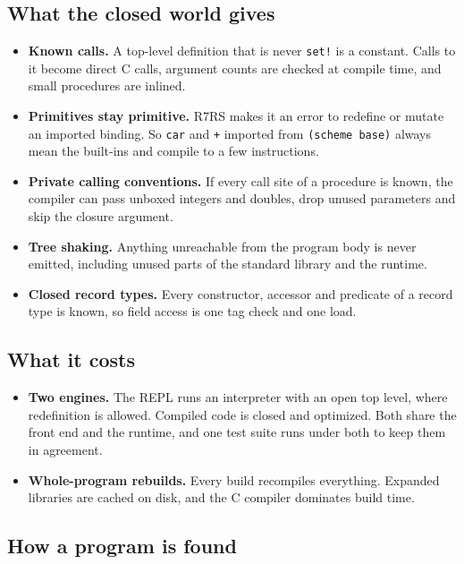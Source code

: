 \documentclass[a4paper,11pt]{article}
\begin{document}
\subsection{What the closed world gives}

\begin{itemize}
\item \textbf{Known calls.} A top-level definition that is never
  \texttt{set!} is a constant. Calls to it become direct C calls, argument
  counts are checked at compile time, and small procedures are inlined.
\item \textbf{Primitives stay primitive.} R7RS makes it an error to redefine
  or mutate an imported binding. So \texttt{car} and \texttt{+} imported
  from \texttt{(scheme base)} always mean the built-ins and compile to a few
  instructions.
\item \textbf{Private calling conventions.} If every call site of a
  procedure is known, the compiler can pass unboxed integers and doubles,
  drop unused parameters and skip the closure argument.
\item \textbf{Tree shaking.} Anything unreachable from the program body is
  never emitted, including unused parts of the standard library and the
  runtime.
\item \textbf{Closed record types.} Every constructor, accessor and
  predicate of a record type is known, so field access is one tag check and
  one load.
\end{itemize}

\subsection{What it costs}

\begin{itemize}
\item \textbf{Two engines.} The REPL runs an interpreter with an open top
  level, where redefinition is allowed. Compiled code is closed and
  optimized. Both share the front end and the runtime, and one test suite
  runs under both to keep them in agreement.
\item \textbf{Whole-program rebuilds.} Every build recompiles everything.
  Expanded libraries are cached on disk, and the C compiler dominates build
  time.
\end{itemize}

\subsection{How a program is found}
\end{document}
